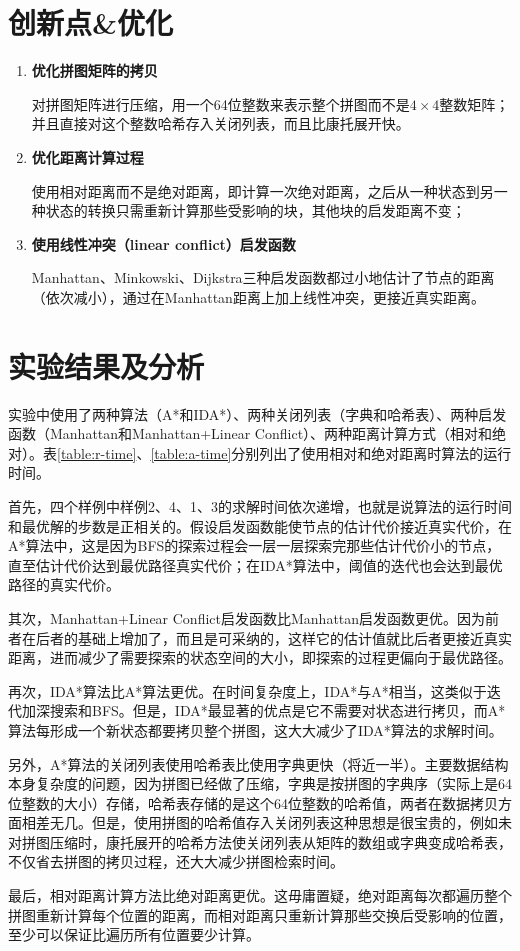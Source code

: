 \documentclass[10pt,letterpaper]{ctexart}
\begin{document}
\section{创新点\&优化}
\begin{enumerate}[itemindent=1.5em,label=\arabic*、]
  \item \textbf{优化拼图矩阵的拷贝}
  \par \qquad 对拼图矩阵进行压缩，用一个64位整数来表示整个拼图而不是$4 \times 4$整数矩阵；并且直接对这个整数哈希存入关闭列表，而且比康托展开快。
  \item \textbf{优化距离计算过程}
  \par \qquad 使用相对距离而不是绝对距离，即计算一次绝对距离，之后从一种状态到另一种状态的转换只需重新计算那些受影响的块，其他块的启发距离不变；
  \item \textbf{使用线性冲突（linear conflict）启发函数}
  \par \qquad Manhattan、Minkowski、Dijkstra三种启发函数都过小地估计了节点的距离（依次减小），通过在Manhattan距离上加上线性冲突，更接近真实距离。
\end{enumerate}
\section{实验结果及分析}
\par 实验中使用了两种算法（A*和IDA*）、两种关闭列表（字典和哈希表）、两种启发函数（Manhattan和Manhattan+Linear Conflict）、两种距离计算方式（相对和绝对）。表\ref{table:r-time}、\ref{table:a-time}分别列出了使用相对和绝对距离时算法的运行时间。
\par 首先，四个样例中样例2、4、1、3的求解时间依次递增，也就是说算法的运行时间和最优解的步数是正相关的。假设启发函数能使节点的估计代价接近真实代价，在A*算法中，这是因为BFS的探索过程会一层一层探索完那些估计代价小的节点，直至估计代价达到最优路径真实代价；在IDA*算法中，阈值的迭代也会达到最优路径的真实代价。
\par 其次，Manhattan+Linear Conflict启发函数比Manhattan启发函数更优。因为前者在后者的基础上增加了，而且是可采纳的，这样它的估计值就比后者更接近真实距离，进而减少了需要探索的状态空间的大小，即探索的过程更偏向于最优路径。
\par 再次，IDA*算法比A*算法更优。在时间复杂度上，IDA*与A*相当，这类似于迭代加深搜索和BFS。但是，IDA*最显著的优点是它不需要对状态进行拷贝，而A*算法每形成一个新状态都要拷贝整个拼图，这大大减少了IDA*算法的求解时间。
\par 另外，A*算法的关闭列表使用哈希表比使用字典更快（将近一半）。主要数据结构本身复杂度的问题，因为拼图已经做了压缩，字典是按拼图的字典序（实际上是64位整数的大小）存储，哈希表存储的是这个64位整数的哈希值，两者在数据拷贝方面相差无几。但是，使用拼图的哈希值存入关闭列表这种思想是很宝贵的，例如未对拼图压缩时，康托展开的哈希方法使关闭列表从矩阵的数组或字典变成哈希表，不仅省去拼图的拷贝过程，还大大减少拼图检索时间。
\par 最后，相对距离计算方法比绝对距离更优。这毋庸置疑，绝对距离每次都遍历整个拼图重新计算每个位置的距离，而相对距离只重新计算那些交换后受影响的位置，至少可以保证比遍历所有位置要少计算。
\end{document}
